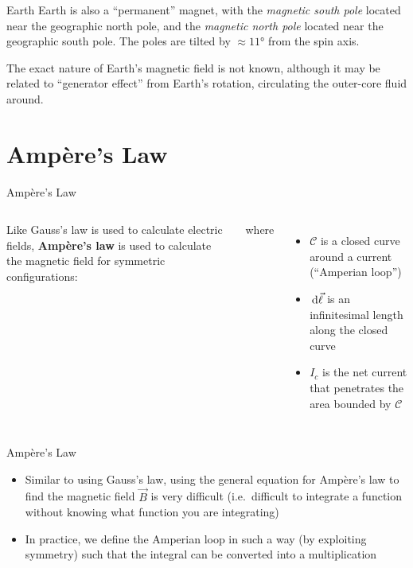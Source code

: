 \documentclass[12pt,aspectratio=169]{beamer}
\begin{document}
    
\begin{frame}{Earth}
  Earth is also a ``permanent'' magnet, with the \emph{magnetic south pole}
  located near the geographic north pole, and the \emph{magnetic north pole}
  located near the geographic south pole. The poles are tilted by
  $\approx\ang{11}$ from the spin axis.
  \begin{center}
  \end{center}
  The exact nature of Earth's magnetic field is not known, although it may be
  related to ``generator effect'' from Earth's rotation, circulating the
  outer-core fluid around.
\end{frame}



\section{Amp\`{e}re's Law}

\begin{frame}{Amp\`{e}re's Law}
  \begin{columns}
    
    Like Gauss's law is used to calculate electric fields,
    \textbf{Amp\`{e}re's law} is used to calculate the magnetic field for
    symmetric configurations:

    where
    \begin{itemize}
    \item $\mathcal C$ is a closed curve around a current (``Amperian loop'')
    \item $\dl{\vec\ell}$ is an infinitesimal length along the closed curve
    \item $I_c$ is the net current that penetrates the area bounded by
      $\mathcal C$
    \end{itemize}
  \end{columns}
\end{frame}



\begin{frame}{Amp\`{e}re's Law}
  
  \begin{itemize}
  \item Similar to using Gauss's law, using the general equation for
    Amp\`{e}re's law to find the magnetic field $\vec B$ is very difficult
    (i.e.\ difficult to integrate a function without knowing what function
    you are integrating)
  \item In practice, we define the Amperian loop in such a way (by exploiting
    symmetry) such that the integral can be converted into a multiplication

  \end{itemize}
\end{frame}
\end{document}
